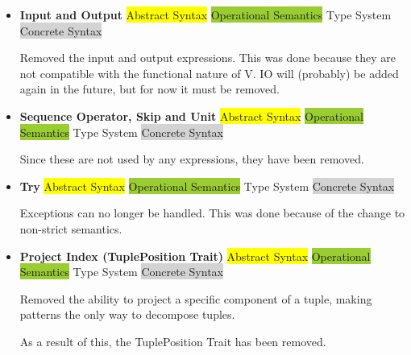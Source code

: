 \documentclass{article}
\begin{document}
\begin{itemize}
  \item \textbf{Input and Output} \; \; {\small\colorbox{yellow}{Abstract Syntax} \colorbox{YellowGreen}{Operational Semantics} \colorbox{ProcessBlue}{Type System} \colorbox{lightgray}{Concrete Syntax}}

      Removed the input and output expressions.
      This was done because they are not compatible with the functional nature of V.
      IO will (probably) be added again in the future, but for now it must be removed.

  \item \textbf{Sequence Operator, Skip and Unit} \; \; {\small\colorbox{yellow}{Abstract Syntax} \colorbox{YellowGreen}{Operational Semantics} \colorbox{ProcessBlue}{Type System} \colorbox{lightgray}{Concrete Syntax}}

      Since these are not used by any expressions, they have been removed.

  \item \textbf{Try} \; \; {\small\colorbox{yellow}{Abstract Syntax} \colorbox{YellowGreen}{Operational Semantics} \colorbox{ProcessBlue}{Type System} \colorbox{lightgray}{Concrete Syntax}}

      Exceptions can no longer be handled.
      This was done because of the change to non-strict semantics.

  \item \textbf{Project Index (TuplePosition Trait)} \; \; {\small\colorbox{yellow}{Abstract Syntax} \colorbox{YellowGreen}{Operational Semantics} \colorbox{ProcessBlue}{Type System} \colorbox{lightgray}{Concrete Syntax}}

      Removed the ability to project a specific component of a tuple, making patterns the only way to decompose tuples.

      As a result of this, the TuplePosition Trait has been removed.
\end{itemize}
\end{document}
